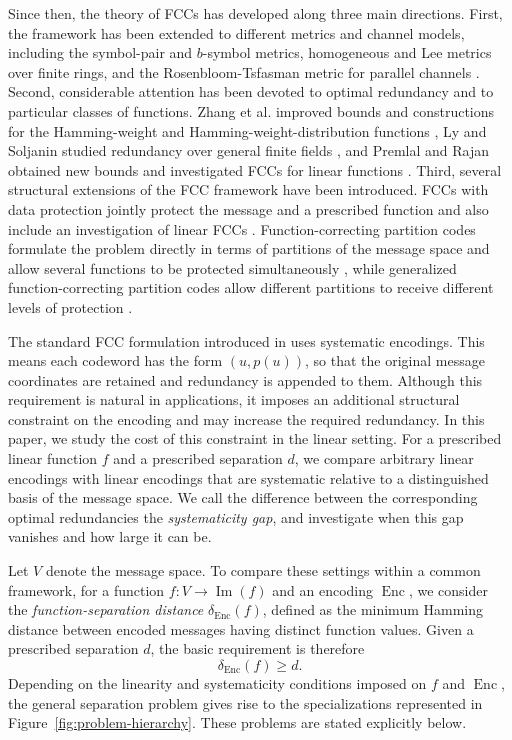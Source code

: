 \documentclass[a4paper,12pt]{article}
\theoremstyle{plain}
\theoremstyle{definition}
\newcommand{\Enc}{\operatorname{Enc}}
\newcommand{\Imf}{\operatorname{Im}}
\begin{document}
Since then, the theory of FCCs has developed along three main
directions. 
First, the framework has been extended to different
metrics and channel models, including the symbol-pair and
$b$-symbol metrics, homogeneous and Lee metrics over finite rings,
and the Rosenbloom-Tsfasman metric for parallel channels
\cite{hareesh2026,liu2026homogeneous,liu2026rt,
singh2025bsymbol,verma2026bsymbol,verma2025lee,
verma2026chainring,xia2024}.
Second, considerable attention has been devoted to
optimal redundancy and to particular classes of functions. Zhang
et al. improved bounds and constructions for the Hamming-weight and
Hamming-weight-distribution functions \cite{ge2025}, Ly and
Soljanin studied redundancy over general finite fields
\cite{ly2025}, and Premlal and Rajan obtained new bounds and investigated FCCs for linear functions \cite{premlal2025}. 
Third, several structural extensions of the FCC framework have been introduced. 
FCCs with data protection jointly protect the message
and a prescribed function and also include an investigation of
linear FCCs \cite{rajput2026}.
Function-correcting partition codes
formulate the problem directly in terms of partitions of the message space and allow several functions to be protected simultaneously \cite{rajputpartition2026}, while generalized function-correcting partition codes allow different partitions to receive different levels of protection
\cite{rajputgeneralized2026}. 


The standard FCC formulation introduced in \cite{lenz2023} uses systematic encodings. This means each codeword has the form $(u,p(u))$, so that the original message coordinates are retained
and redundancy is appended to them. 
Although this requirement is
natural in applications, it imposes an additional structural constraint on the encoding and may increase the required redundancy.
In this paper, we study the cost of this constraint in
the linear setting. 
For a prescribed linear function $f$ and a
prescribed separation $d$, we compare arbitrary linear encodings with
linear encodings that are systematic relative to a distinguished basis of the
message space. We call the difference between the corresponding
optimal redundancies the \emph{systematicity gap}, and investigate
when this gap vanishes and how large it can be.


Let $V$ denote the message space. To compare these settings within a
common framework, for a function $f\colon V\to\Imf(f)$ and an encoding
$\Enc$, we consider the \emph{function-separation distance}
$\delta_{\Enc}(f)$, defined as the minimum Hamming distance between
encoded messages having distinct function values.
Given a prescribed separation $d$, the basic
requirement is therefore
\[
\delta_{\Enc}(f)\geq d.
\]
Depending on the linearity and systematicity conditions imposed on $f$ and $\Enc$, the general separation problem gives rise to the specializations represented in Figure~\ref{fig:problem-hierarchy}.
These problems are stated explicitly below.
\end{document}
